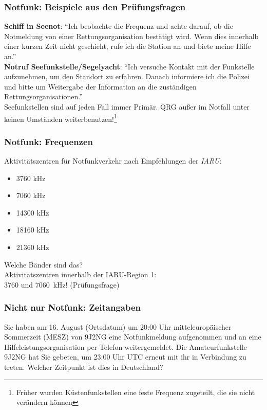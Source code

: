 \begin{frame}
    \frametitle{Notfunk: Beispiele aus den Prüfungsfragen}

    \textbf{Schiff in Seenot}: ``Ich beobachte die Frequenz und achte darauf, ob
    die Notmeldung von einer Rettungsorganisation bestätigt wird. Wenn dies
    innerhalb einer kurzen Zeit nicht geschieht, rufe ich die Station an und
    biete meine Hilfe an.'' \\[2em]

    \textbf{Notruf Seefunkstelle/Segelyacht}: ``Ich versuche Kontakt mit der
    Funkstelle aufzunehmen, um den Standort zu erfahren. Danach informiere ich
    die Polizei und bitte um Weitergabe der Information an die zuständigen
    Rettungsorganisationen.'' \\[2em]

    Seefunkstellen sind auf jeden Fall immer Primär. QRG außer im Notfall unter
    keinen Umständen weiterbenutzen!\footnote{Früher wurden Küstenfunkstellen
    eine feste Frequenz zugeteilt, die sie nicht verändern können}

\end{frame}

\begin{frame}
    \frametitle{Notfunk: Frequenzen}

    Aktivitätszentren für Notfunkverkehr nach Empfehlungen der \emph{IARU}:

    \begin{itemize}
        \item 3760 kHz
        \item 7060 kHz
        \item 14300 kHz
        \item 18160 kHz
        \item 21360 kHz
    \end{itemize}

    Welche Bänder sind das? \\[1em]

    Aktivitätszentren innerhalb der IARU-Region 1:\\
    3760 und 7060~kHz! (Prüfungsfrage)

\end{frame}

\begin{frame}
    \frametitle{Nicht nur Notfunk: Zeitangaben}

    \begin{exampleblock}{
        Sie haben am 16. August (Ortsdatum) um 20:00 Uhr mitteleuropäischer
        Sommerzeit (MESZ) von 9J2NG eine Notfunkmeldung aufgenommen und an eine
        Hilfeleistungsorganisation per Telefon weitergemeldet. Die Amateurfunkstelle
        9J2NG hat Sie gebeten, um 23:00 Uhr UTC erneut mit ihr in Verbindung zu
        treten. Welcher Zeitpunkt ist dies in Deutschland?}
    \end{exampleblock}

\end{frame}

